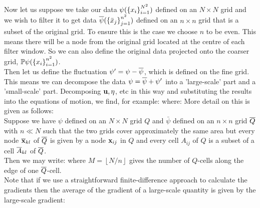 \documentclass[10pt]{article}
\begin{document}
Now let us suppose we take our data $\psi(\left\{x_{i}\right\}_{i=1}^{N^{2}})$ defined on an $N\times N$ grid and we wish to filter it to get data $\overline{\psi}(\left\{\bar{x}_{j}\right\}_{j=1}^{n^{2}})$ defined on an $n\times n$ grid that is a subset of the original grid. To ensure this is the case we choose $n$ to be even. This means there will be a node from the original grid located at the centre of each filter window. So we can also define the original data projected onto the coarser grid, $\mathbb{P}\psi(\left\{x_{i}\right\}_{i=1}^{n^{2}})$.\\
\linebreak
Then let us define the fluctuation $\psi' = \psi - \overline{\psi}$, which is defined on the fine grid. This means we can decompose the data $\psi = \overline{\psi} + \psi'$ into a 'large-scale' part and a 'small-scale' part. Decomposing $\mathbf{u}, \eta$, etc in this way and substituting the results into the equations of motion, we find, for example:
where:
More detail on this is given as follows:\\
\linebreak
Suppose we have $\psi$ defined on an $N\times N$ grid $Q$ and $\bar{\psi}$ defined on an $n\times n$ grid $\overline{Q}$ with $n \ll N$ such that the two grids cover approximately the same area but every node $\overline{\mathbf{x}}_{kl}$ of $\overline{Q}$ is given by a node $\mathbf{x}_{ij}$ in $Q$ and every cell $A_{ij}$ of $Q$ is a subset of a cell $\overline{A}_{kl}$ of $\overline{Q}$. \\
\linebreak
Then we may write:
where $M = \left \lfloor{N/n}\right \rfloor$ gives the number of $Q$-cells along the edge of one $\overline{Q}$-cell. \\
\linebreak
Note that if we use a straightforward finite-difference approach to calculate the gradients then the average of the gradient of a large-scale quantity is given by the large-scale gradient:
\end{document}
